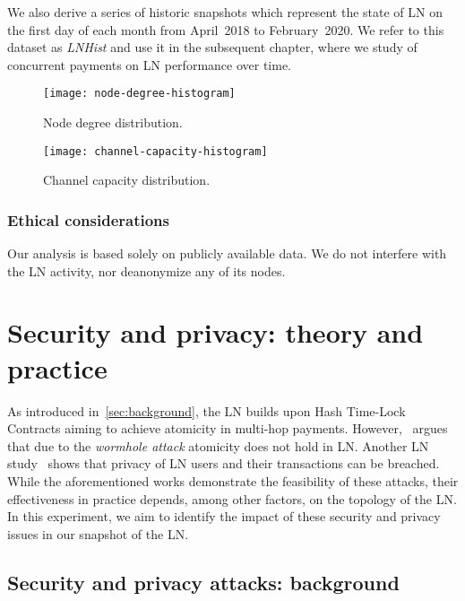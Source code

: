 We also derive a series of historic snapshots which represent the state of LN on the first day of each month from April~2018 to February~2020.
We refer to this dataset as \textit{LNHist} 
and use it in the subsequent chapter, where we study of concurrent payments on LN performance over time.


\begin{figure}[tb]
	\centering
	\texttt{[image: node-degree-histogram]}
	\caption{Node degree distribution.\label{fig:node-degree-histogram}}
\end{figure}

\begin{figure}[tb]
	\centering
	\texttt{[image: channel-capacity-histogram]}
	\caption{Channel capacity distribution.\label{fig:channel-capacity-histogram}}
\end{figure}

\subsubsection*{Ethical considerations} 
Our analysis is based solely on publicly available data. 
We do not interfere with the LN activity, nor deanonymize any of its nodes. 


\section{Security and privacy: theory and practice}
\label{sec:sec-priv-attacks}

As introduced in~\cref{sec:background}, the LN builds upon Hash Time-Lock Contracts aiming to achieve 
atomicity in multi-hop payments.
However,~\cite{Malavolta2019} argues that due to the \emph{wormhole attack} atomicity does not hold in LN.
Another LN study~\cite{Malavolta2017} shows that privacy of LN users and their transactions can be breached.
While the aforementioned works demonstrate the feasibility of these attacks, 
their effectiveness in practice depends, among other factors, on the topology of the LN.
In this experiment, we aim to identify the impact of these security and privacy issues in our snapshot of the LN.

\subsection{Security and privacy attacks: background}

